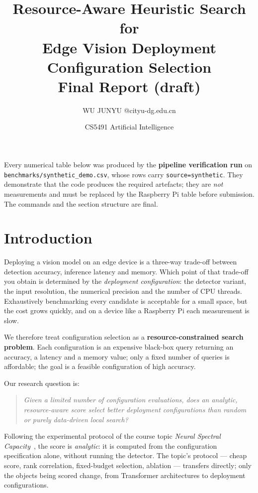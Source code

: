 \documentclass[11pt,a4paper]{article}
\title{\vspace{-2.2cm}\textbf{Resource-Aware Heuristic Search for\\Edge Vision Deployment Configuration Selection}\\[4pt]
\large Final Report (draft)}
\author{WU JUNYU \quad 72655994 \quad 72655994@cityu-dg.edu.cn}
\date{CS5491 Artificial Intelligence}
\begin{document}
\maketitle
\vspace{-1.2em}

\begin{tcolorbox}[colback=orange!6,colframe=orange!55!black,title=\textbf{Status of the numbers in this draft}]
Every numerical table below was produced by the \textbf{pipeline verification run}
on \texttt{benchmarks/synthetic\_demo.csv}, whose rows carry
\texttt{source=synthetic}. They demonstrate that the code produces the required
artefacts; they are \emph{not} measurements and must be replaced by the
Raspberry Pi table before submission. The commands and the section structure are
final.
\end{tcolorbox}

\section{Introduction}

Deploying a vision model on an edge device is a three-way trade-off between
detection accuracy, inference latency and memory. Which point of that trade-off
you obtain is determined by the \emph{deployment configuration}: the detector
variant, the input resolution, the numerical precision and the number of CPU
threads. Exhaustively benchmarking every candidate is acceptable for a small
space, but the cost grows quickly, and on a device like a Raspberry Pi each
measurement is slow.

We therefore treat configuration selection as a \textbf{resource-constrained
search problem}. Each configuration is an expensive black-box query returning an
accuracy, a latency and a memory value; only a fixed number of queries is
affordable; the goal is a feasible configuration of high accuracy.

Our research question is:

\begin{quote}\itshape
Given a limited number of configuration evaluations, does an analytic,
resource-aware score select better deployment configurations than random or
purely data-driven local search?
\end{quote}

Following the experimental protocol of the course topic \emph{Neural Spectral
Capacity}~\cite{nsc}, the score is \emph{analytic}: it is computed from the
configuration specification alone, without running the detector. The topic's
protocol --- cheap score, rank correlation, fixed-budget selection, ablation ---
transfers directly; only the objects being scored change, from Transformer
architectures to deployment configurations.
\end{document}
